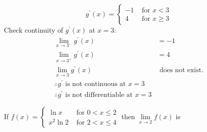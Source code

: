 \documentclass[12pt,letterpaper, onecolumn]{exam}
\begin{document}
\begin{questions}
\begin{solution}
	$$ g^\prime(x) =
	\begin{cases}
	-1 & \text{ for } x < 3 \\
	 4 & \text{ for } x \geq 3
	\end{cases}	
	$$
	Check continuity of $g^\prime(x)$ at $x=3$:
	\begin{align*}
		\lim_{x\to3^-} g^\prime(x)  &=  -1 \\ %
		\lim_{x\to3^+} g^\prime(x) &= 4 \\ %
		\lim_{x\to3} g^\prime(x)      & \text{ does not exist.} \\ %
		\therefore g^\prime \text{ is not continuous at } x=3 \\
		\boxed{\therefore g^\prime \text{ is not differentiable at } x=3}
	\end{align*}

    \end{solution}
    

\pagebreak

\question 
    If $ f(x) = 
\begin{cases}
	\ln x 		& \text{ for } 	    0 < x \leq 2 \\ 
	x^2 \ln 2 	& \text { for } 	2 < x \leq 4
\end{cases}
$ then $ \lim\limits_{x\to2} f(x) $ is


    
    \begin{solution}
	

\end{solution}
\end{questions}
\end{document}
